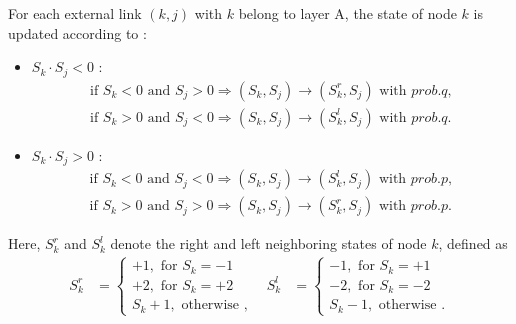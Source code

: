 For each external link $(k,j)$ with $k$ belong to layer A, the state of node $k$ is updated according to :
\begin{itemize}
	\item $S_k \cdot S_j < 0$ :
	\begin{align}
	\mbox{if } S_k<0 \mbox{ and } S_j>0  \Rightarrow (S_k, S_j) \rightarrow (S_k^r, S_j) \mbox{ with } prob.q,\\
	\mbox{if } S_k>0 \mbox{ and } S_j<0  \Rightarrow (S_k, S_j) \rightarrow (S_k^l, S_j) \mbox{ with } prob.q.
	\end{align}
	\item $S_k \cdot S_j > 0$ :
	\begin{align}
	\mbox{if } S_k<0 \mbox{ and } S_j<0  \Rightarrow (S_k, S_j) \rightarrow (S_k^l, S_j) \mbox{ with } prob.p,\\
	\mbox{if } S_k>0 \mbox{ and } S_j>0  \Rightarrow (S_k, S_j) \rightarrow (S_k^r, S_j) \mbox{ with } prob.p.
	\end{align}
\end{itemize}

Here, $S_k^r$ and $S_k^l$ denote the right and left neighboring states of node $k$, defined as
\begin{align}
S_k^r &= \left\{\begin{matrix}
+1,\mbox{ for } S_k = -1\\
+2,\mbox{ for } S_k = +2\\ 
S_k + 1,\mbox{ otherwise }, 
\end{matrix}\right. &
S_k^l &= \left\{\begin{matrix}
-1,\mbox{ for } S_k= +1
\\ -2,\mbox{ for } S_k=-2
\\ S_k - 1,\mbox{ otherwise }.
\end{matrix}\right.
\end{align}

